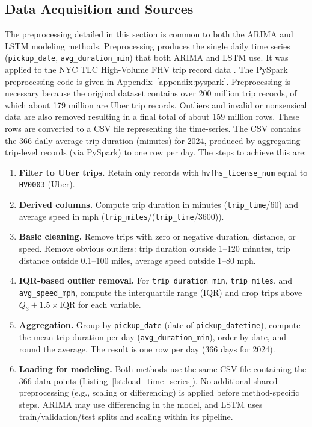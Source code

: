 \documentclass[12pt, a4paper]{article}
\begin{document}
\subsection{Data Acquisition and Sources}\label{sec:preprocessing}

The preprocessing detailed in this section is common to both the ARIMA and LSTM modeling methods. Preprocessing produces the single daily time series (\texttt{pickup\_date}, \texttt{avg\_duration\_min}) that both ARIMA and LSTM use. It was applied to the NYC TLC High-Volume FHV trip record data \cite{nyctlc2024}. The PySpark preprocessing code is given in Appendix~\ref{appendix:pyspark}. Preprocessing is necessary because the original dataset contains over 200 million trip records, of which about 179 million are Uber trip records. Outliers and invalid or nonsensical data are also removed resulting in a final total of about 159 million rows. These rows are converted to a CSV file representing the time-series. The CSV contains the 366 daily average trip duration (minutes) for 2024, produced by aggregating trip-level records (via PySpark) to one row per day. The steps to achieve this are:

\begin{enumerate}
\item \textbf{Filter to Uber trips.} Retain only records with \texttt{hvfhs\_license\_num} equal to \texttt{HV0003} (Uber).
\item \textbf{Derived columns.} Compute trip duration in minutes (\texttt{trip\_time}/60) and average speed in mph (\texttt{trip\_miles}/(\texttt{trip\_time}/3600)).
\item \textbf{Basic cleaning.} Remove trips with zero or negative duration, distance, or speed. Remove obvious outliers: trip duration outside 1--120 minutes, trip distance outside 0.1--100 miles, average speed outside 1--80 mph.
\item \textbf{IQR-based outlier removal.} For \texttt{trip\_duration\_min}, \texttt{trip\_miles}, and \texttt{avg\_speed\_mph}, compute the interquartile range (IQR) and drop trips above $Q_3 + 1.5 \times \text{IQR}$ for each variable.
\item \textbf{Aggregation.} Group by \texttt{pickup\_date} (date of \texttt{pickup\_datetime}), compute the mean trip duration per day (\texttt{avg\_duration\_min}), order by date, and round the average. The result is one row per day (366 days for 2024).
\item \textbf{Loading for modeling.} Both methods use the same CSV file containing the 366 data points (Listing~\ref{lst:load_time_series}). No additional shared preprocessing (e.g., scaling or differencing) is applied before method-specific steps. ARIMA may use differencing in the model, and LSTM uses train/validation/test splits and scaling within its pipeline.
\end{enumerate}
\end{document}
